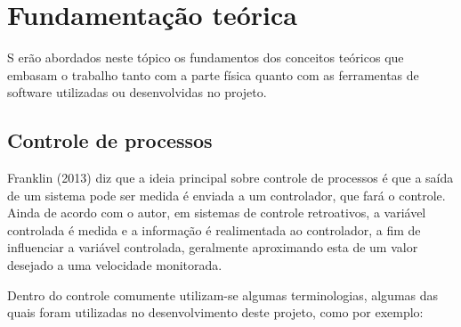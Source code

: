 \chapter{Fundamentação teórica}


\lettrine[lines=3]{S}{} erão abordados neste tópico os fundamentos dos conceitos teóricos que embasam o trabalho tanto com a parte física quanto com as ferramentas de software utilizadas ou desenvolvidas no projeto.


\section{Controle de processos}
\hspace{11mm} Franklin (2013) diz que a ideia principal sobre controle de processos é que a saída de um sistema pode ser medida é enviada a um controlador, que fará o controle. Ainda de acordo com o autor, em sistemas de controle retroativos, a variável controlada é medida e a informação é realimentada ao controlador, a fim de influenciar a variável controlada, geralmente aproximando esta de um valor desejado a uma velocidade monitorada.

Dentro do controle comumente utilizam-se algumas terminologias, algumas das quais foram utilizadas no desenvolvimento deste projeto, como por exemplo:

